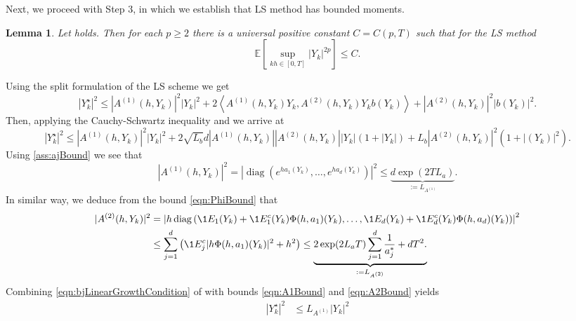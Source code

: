 \documentclass[sort&compress, preprint]{elsarticle}
\theoremstyle{definition}
\theoremstyle{plain}%
\newtheorem{lem}{Lemma}[section]
\theoremstyle{remark}
\newcommand{\m}[1]{\mathbb{E}#1}
\newcommand{\innerprod}[2]{\left\langle#1, #2\right\rangle}
\DeclareMathOperator{\diag}{diag}
\newcommand{\SM}{LS\xspace}
\begin{document}
	Next, we proceed with Step 3, in which we establish that \SM method has bounded moments.
\begin{lem}\label{lem:SSSMMomentBounds}
	Let  holds. Then for each $p\geq 2$ there is 
	a universal positive constant 
	$C=C(p,T)$ 
	such that for the \SM method
	\begin{equation*}
		\m\left[
		\sup_{kh \in [0,T]}
		|Y_k|^{2p}
		\right]\leq C.
	\end{equation*}
\end{lem}
\begin{pf}
	Using the split formulation of the \SM scheme  we get
	\begin{dmath}[label=leqn:Yn2Bound]
		|Y_k^{\star}|^{2}
		\leq
			|A^{(1)}(h,Y_k)|^2 |Y_k|^2  
			+ 2 \innerprod{A^{(1)}(h,Y_k)Y_k}{A^{(2)}(h,Y_k) Y_k b(Y_k)}
			+|A^{(2)}(h,Y_k)|^2 |b(Y_k)|^2.
	\end{dmath}
	Then, applying the Cauchy-Schwartz inequality and  we arrive at
	\begin{dmath*}[label=leqn:Yn2Bound]
		|Y_k^{\star}|^{2}
		\leq
		|A^{(1)}(h,Y_k)|^2 |Y_k|^2  
		+ 2 \sqrt{L_b} d|A^{(1)}(h,Y_k)||A^{(2)}(h,Y_k)||Y_k|(1+|Y_k|)
		+L_b|A^{(2)}(h,Y_k)|^2 (1+|(Y_k)|^2).
	\end{dmath*}
	Using \eqref{ass:ajBound} we see that
	\begin{dmath}[label=eqn:A1Bound]
		|A^{(1)}(h,Y_k)|^2 
		=
			\left|
				\diag
				\left(
					e^{ha_1(Y_k)}, \dots, e^{ha_d(Y_k)} 
				\right)
			\right|^2
		\leq
		 \underbrace{d \exp( 2 T L_a)}_{:= L_{A^{(1)}}}.		
	\end{dmath}
	In similar way, we deduce from the bound \eqref{eqn:PhiBound} that
	\begin{align}
		|A^{(2)}(h,Y_k)|^2 
		&=
		\left|
			h 
			\diag
			\left(
				\1{E_1}(Y_k)
				+\1{E_1^c}(Y_k)\Phi(h,a_1)(Y_k), 
				\dots,
				\1{E_d}(Y_k)
				+\1{E_d^c}(Y_k) \Phi(h,a_d)(Y_k)
			\right)
		\right|^2 \notag \\
		&\leq
		\sum_{j=1}^{d}
		\left(
			\1{E_j^c}
			|h\Phi(h,a_1)(Y_k)|^2
			+ h^2
		\right)
		\leq
		\underbrace{
			2\exp(2 L_a  T)
				\sum_{j=1}^d
				\frac{1}{a_j^*} + d T^2.			
		}_{:=L_{A^{(2)}}}
		\label{eqn:A2Bound}
	\end{align}
	Combining \eqref{eqn:bjLinearGrowthCondition} of  with bounds \eqref{eqn:A1Bound}
	and \eqref{eqn:A2Bound} yields
	\begin{align*}
		|Y_k^{\star}|^2
		&\leq
			L_{A^{(1)}} |Y_k|^2

\end{align*}
\end{pf}
\end{document}
